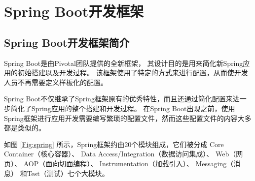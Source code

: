


\section{Spring Boot开发框架}
\subsection{Spring Boot开发框架简介}
Spring Boot是由Pivotal团队提供的全新框架，
其设计目的是用来简化新Spring应用的初始搭建以及开发过程。
该框架使用了特定的方式来进行配置，从而使开发人员不再需要定义样板化的配置。


Spring Boot不仅继承了Spring框架原有的优秀特性，而且还通过简化配置来进一步简化了Spring应用的整个搭建和开发过程。
在Spring Boot出现之前，使用Spring框架进行应用开发需要编写繁琐的配置文件，然而这些配置文件的内容大多都是类似的。

如图 \ref{Fig:spring} 所示，Spring框架约由20个模块组成，它们被分成
Core Container（核心容器）、
Data Access/Integration（数据访问集成）、
Web（网页）、
AOP（面向切面编程）、
Instrumentation（加载引入）、
Messaging（消息）
和Test（测试）七个大模块。

